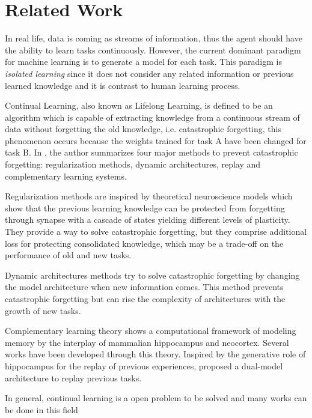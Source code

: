\section{Related Work}
In real life, data is coming as streams of information, thus the agent should have the ability to learn tasks continuously. However, the current dominant paradigm for machine learning is to generate a model for each task. This paradigm is \textit{isolated learning}\cite{zhiyuan2017lml} since it does not consider any related information or previous learned knowledge and it is contrast to human learning process.

Continual Learning, also known as Lifelong Learning, is defined to be an algorithm which is capable of extracting knowledge from a continuous stream of data without forgetting the old knowledge, i.e. catastrophic forgetting\cite{thrun1995lifelong}, this phenomenon occurs because the weights trained for task A have been changed for task B. In \cite{parisi2019continual}, the author summarizes four major methods to prevent catastrophic forgetting: regularization methods, dynamic architectures, replay and complementary learning systems.  

Regularization methods\cite{li2017learning}\cite{kirkpatrick2017overcoming} are inspired by theoretical neuroscience models which show that the previous learning knowledge can be protected from forgetting through synapse with a cascade of states yielding different levels of plasticity. They provide a way to solve catastrophic forgetting, but they comprise additional loss for protecting consolidated knowledge, which may be a trade-off on the performance of old and new tasks.

Dynamic architectures methods \cite{rusu2016progressive}\cite{yoon2017lifelong} try to solve catastrophic forgetting by changing the model architecture when new information comes. This method prevents catastrophic forgetting but can rise the complexity of architectures with the growth of new tasks.

Complementary learning theory shows a computational framework of modeling memory by the interplay of mammalian hippocampus and neocortex. Several works have been developed through this theory\cite{Mo19CLS}. Inspired by the generative role of hippocampus for the replay of previous experiences, \cite{Shin19DeepGen} proposed a dual-model architecture to replay previous tasks. 

In general, continual learning is a open problem to be solved and many works can be done in this field
 
 